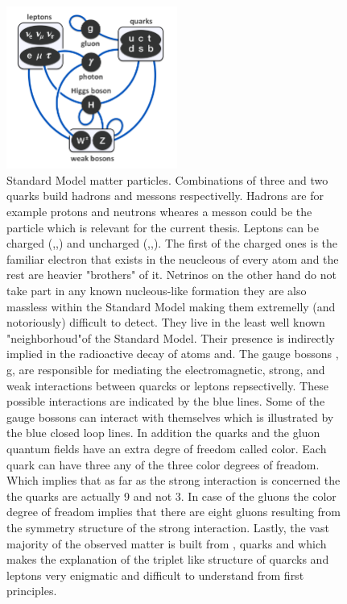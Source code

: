 \begin{figure}[h]
\begin{center}
  \includegraphics[width=0.5\textwidth]{Figures/Chapter1/Standard_Model_Particles.png}
  \caption{Standard Model matter particles. Combinations of three and two quarks build hadrons and messons respectivelly.
           Hadrons are for example protons and neutrons wheares a messon could be the \Bs particle which is relevant for the current thesis.
           Leptons can be charged (\electron,\mmu,\mtau) and uncharged (\neue,\neum,\neut). The first of the charged ones is the familiar
           electron that exists in the neucleous of every atom and the rest are heavier "brothers" of it. Netrinos on the other hand
           do not take part in any known nucleous-like formation they are also massless within the Standard Model making them extremelly (and notoriously)
           difficult to detect. They live in the least well known "neighborhoud"of the Standard Model. Their presence is indirectly
           implied in the radioactive decay of atoms and. The gauge bossons \g, g, \Wpm \Z  are responsible for mediating the electromagnetic,
           strong, and weak interactions between quarcks or leptons repsectivelly. These possible interactions are indicated by the blue
           lines. Some of the gauge bossons can interact with themselves which is illustrated by the blue closed loop lines.
           In addition the quarks and the gluon quantum fields have an extra degre of freedom called color. Each quark can have three
           any of the three color degrees of freadom. Which implies that as far as the strong interaction is concerned the the quarks are
           actually 9 and not 3. In case of the gluons the color degree of freadom implies that there are eight gluons resulting from
           the symmetry structure of the strong interaction. Lastly, the vast majority of the observed matter is built from \uquark, \dquark
           quarks and \electron which makes the explanation of the triplet like structure of quarcks and leptons very enigmatic and difficult
           to understand from first principles.}
  \label{sm_particles}
\end{center}
\end{figure}

